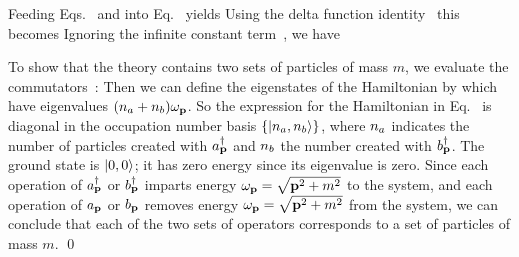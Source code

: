 \documentclass[11pt]{article}
\begin{document}
{	Feeding Eqs.~ and  into Eq.~ yields
	Using the delta function identity~\cite{Dirac}
	this becomes
	Ignoring the infinite constant term~\cite[p.~21]{Peskin}, we have
	
	To show that the theory contains two sets of particles of mass $m$, we evaluate the commutators~\cite[p.~22]{Peskin}:
	Then we can define the eigenstates of the Hamiltonian by
	\eq{
		(\apdag)^{\na} \,(\bpdag)^{\nb} \koo \equiv \knanb,
	}
	which have eigenvalues $(n_a + n_b) \omega_{\vb{p}}$.  So the expression for the Hamiltonian in Eq.~ is diagonal in the occupation number basis $\{ \ket{n_a, n_b} \}$, where $n_a$ indicates the number of particles created with $a_{\vb{p}}^\dagger$ and $n_b$ the number created with $b_{\vb{p}}^\dagger$.  The ground state is $\ket{0, 0}$; it has zero energy since its eigenvalue is zero.  Since each operation of $a_{\vb{p}}^\dagger$ or $b_{\vb{p}}^\dagger$ imparts energy $\omega_{\vb{p}} = \sqrt{\vb{p}^2 + m^2}$ to the system, and each operation of $a_{\vb{p}}$ or $b_{\vb{p}}$ removes energy $\omega_{\vb{p}} = \sqrt{\vb{p}^2 + m^2}$ from the system, we can conclude that each of the two sets of operators corresponds to a set of particles of mass $m$. \qed
}
\end{document}
